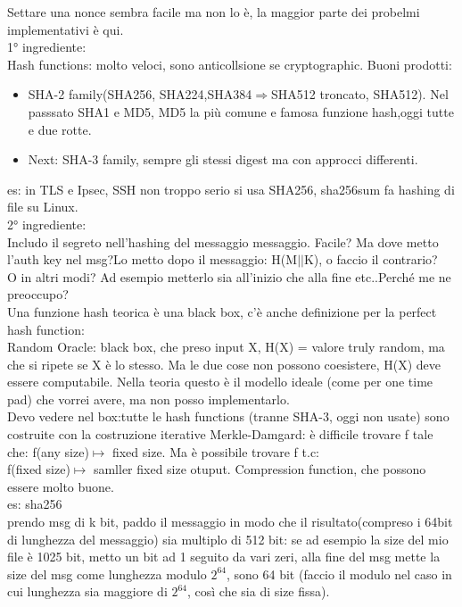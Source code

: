 \documentclass[16px]{article}
\begin{document}
Settare una nonce sembra facile ma non lo è, la maggior parte dei probelmi implementativi è qui.\\
1° ingrediente:\\
Hash functions: molto veloci, sono anticollsione se cryptographic. Buoni prodotti:
\begin{itemize}
\item SHA-2 family(SHA256, SHA224,SHA384$\Rightarrow$SHA512 troncato, SHA512).
Nel passsato SHA1 e MD5, MD5 la più comune e famosa funzione hash,oggi tutte e due rotte.
\item Next: SHA-3 family, sempre gli stessi digest ma con approcci differenti.
\end{itemize}
es: in TLS e Ipsec, SSH non troppo serio si usa SHA256, sha256sum fa hashing di file su Linux.\\
2° ingrediente:\\
Includo il segreto nell'hashing del messaggio messaggio.
Facile? Ma dove metto l'auth key nel msg?Lo metto dopo il messaggio: H(M$||$K), o faccio il contrario?\\
O in altri modi? Ad esempio metterlo sia all'inizio che alla fine etc..Perché me ne preoccupo?\\
Una funzione hash teorica è una black box, c'è anche definizione per la perfect hash function:\\
Random Oracle: black box, che preso input X, H(X) = valore truly random, ma che si ripete se X è lo stesso. Ma le due cose non possono coesistere, H(X) deve essere computabile. Nella teoria questo è il modello ideale (come per one time pad) che vorrei avere, ma non posso implementarlo.\\
Devo vedere nel box:tutte le hash functions (tranne SHA-3, oggi non usate) sono costruite con la costruzione iterative Merkle-Damgard:
è difficile trovare f tale che: f(any size)$\longmapsto$ fixed size. Ma è possibile trovare f t.c:\\
f(fixed size)$\longmapsto$ samller fixed size otuput. Compression function, che possono essere molto buone.\\
es: sha256\\
prendo msg di k bit, paddo il messaggio in modo che il risultato(compreso i 64bit di lunghezza del messaggio) sia multiplo di 512 bit: se ad esempio la size del mio file è 1025 bit, metto un bit ad 1 seguito da vari zeri, alla fine del msg mette la size del msg come lunghezza modulo $2^{64}$, sono 64 bit (faccio il modulo nel caso in cui lunghezza sia maggiore di $2^{64}$, così che sia di size fissa).
\end{document}
